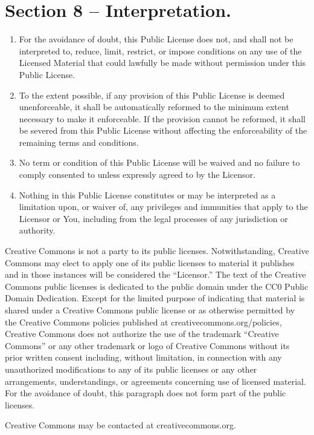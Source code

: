 \documentclass[a4paper, 12pt]{article}
\begin{document}
\section*{Section 8 – Interpretation.}

\begin{enumerate}[label=\alph*.]
\item For the avoidance of doubt, this Public License does not, and shall not be interpreted to, reduce, limit, restrict, or impose conditions on any use of the Licensed Material that could lawfully be made without permission under this Public License.
\item To the extent possible, if any provision of this Public License is deemed unenforceable, it shall be automatically reformed to the minimum extent necessary to make it enforceable. If the provision cannot be reformed, it shall be severed from this Public License without affecting the enforceability of the remaining terms and conditions.
\item No term or condition of this Public License will be waived and no failure to comply consented to unless expressly agreed to by the Licensor.
\item Nothing in this Public License constitutes or may be interpreted as a limitation upon, or waiver of, any privileges and immunities that apply to the Licensor or You, including from the legal processes of any jurisdiction or authority.
\end{enumerate}

\vspace{1cm}

Creative Commons is not a party to its public licenses. Notwithstanding, Creative Commons may elect to apply one of its public licenses to material it publishes and in those instances will be considered the ``Licensor.'' The text of the Creative Commons public licenses is dedicated to the public domain under the CC0 Public Domain Dedication. Except for the limited purpose of indicating that material is shared under a Creative Commons public license or as otherwise permitted by the Creative Commons policies published at creativecommons.org/policies, Creative Commons does not authorize the use of the trademark ``Creative Commons'' or any other trademark or logo of Creative Commons without its prior written consent including, without limitation, in connection with any unauthorized modifications to any of its public licenses or any other arrangements, understandings, or agreements concerning use of licensed material. For the avoidance of doubt, this paragraph does not form part of the public licenses.

\vspace{0.5cm}

Creative Commons may be contacted at creativecommons.org.
\end{document}
